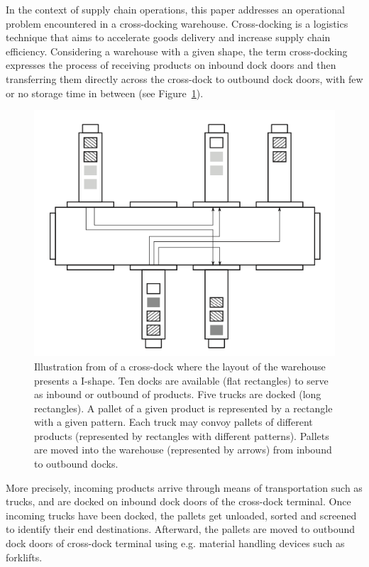 \documentclass[preprint,12pt,authoryear]{elsarticle}
\begin{document}
In the context of supply chain operations, this paper addresses an operational  problem encountered in a cross-docking warehouse. 
%
Cross-docking is a logistics technique that aims to accelerate goods delivery and increase supply chain efficiency. 
%
Considering a warehouse with a given shape, the term cross-docking expresses the process of receiving products on inbound dock doors and then transferring them directly across the cross-dock to outbound dock doors, with few or no storage time in between (see Figure~\ref{fig:CrossDockVanBelle}).
%
\begin{figure}[h]
\begin{center}
\includegraphics[scale=0.3]{images/CDvanBelle.png}
\caption{Illustration from \cite{VANBELLE2012} of a cross-dock where the layout of the warehouse presents a I-shape. Ten docks are available (flat rectangles) to serve as inbound or outbound of products. 
Five trucks are docked (long rectangles). 
A pallet of a given product is represented by a rectangle with a given pattern.
Each truck may convoy pallets of different products (represented by rectangles with different patterns).
Pallets are moved into the warehouse (represented by arrows) from inbound to outbound docks.}
\label{fig:CrossDockVanBelle}
\end{center}
\end{figure}
%
More precisely, incoming products arrive through means of transportation such as trucks, and are docked on inbound dock doors of the cross-dock terminal. Once incoming trucks have been docked, the pallets get unloaded, sorted and screened to identify their end destinations. 
%
Afterward, the pallets are moved to outbound dock doors of cross-dock terminal using e.g. material handling devices such as forklifts.
\end{document}
